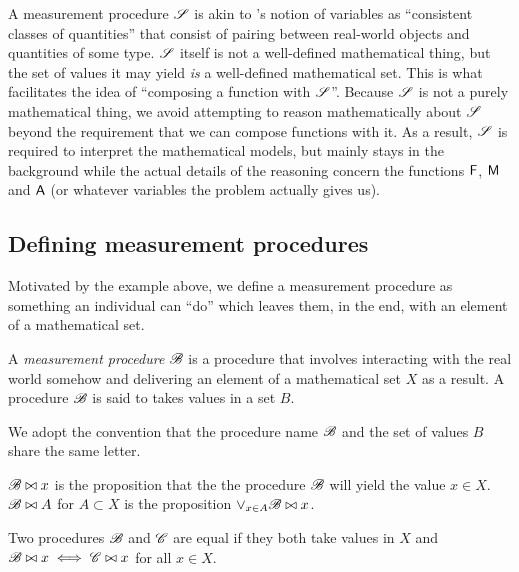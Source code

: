 A measurement procedure $\mathscr{S}$ is akin to \citet{menger_random_2003}'s notion of variables as ``consistent classes of quantities'' that consist of pairing between real-world objects and quantities of some type. $\mathscr{S}$ itself is not a well-defined mathematical thing, but the set of values it may yield \emph{is} a well-defined mathematical set. This is what facilitates the idea of ``composing a function with $\mathscr{S}$''. Because $\mathscr{S}$ is not a purely mathematical thing, we avoid attempting to reason mathematically about $\mathscr{S}$ beyond the requirement that we can compose functions with it. As a result, $\mathscr{S}$ is required to interpret the mathematical models, but mainly stays in the background while the actual details of the reasoning concern the functions $\mathsf{F}$, $\mathsf{M}$ and $\mathsf{A}$ (or whatever variables the problem actually gives us).

\subsection{Defining measurement procedures}\label{sec:mprocs}

Motivated by the example above, we define a measurement procedure as something an individual can ``do'' which leaves them, in the end, with an element of a mathematical set.

\begin{definition}
A \emph{measurement procedure} $\mathscr{B}$ is a procedure that involves interacting with the real world somehow and delivering an element of a mathematical set $X$ as a result. A procedure $\mathscr{B}$ is said to takes values in a set $B$.
\end{definition}

We adopt the convention that the procedure name $\mathscr{B}$ and the set of values $B$ share the same letter.

\begin{definition}
$\mathscr{B}\bowtie x$ is the proposition that the the procedure $\mathscr{B}$ will yield the value $x\in X$. $\mathscr{B}\bowtie A$ for $A\subset X$ is the proposition $\lor_{x\in A} \mathscr{B}\bowtie x$.
\end{definition}

\begin{definition}\label{def:equality}
Two procedures $\mathscr{B}$ and $\mathscr{C}$ are equal if they both take values in $X$ and $\mathscr{B}\bowtie x\iff \mathscr{C}\bowtie x$ for all $x\in X$.
\end{definition}


